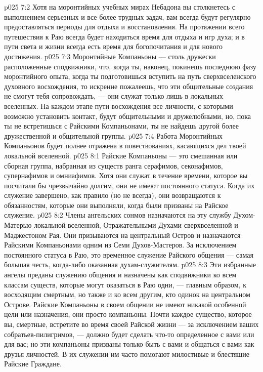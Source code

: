 \vs p025 7:2 Хотя на моронтийных учебных мирах Небадона вы столкнетесь с выполнением серьезных и все более трудных задач, вам всегда будут регулярно предоставляться периоды для отдыха и восстановления. На протяжении всего путешествия к Раю всегда будет находиться время для отдыха и игр духа; и в пути света и жизни всегда есть время для богопочитания и для нового достижения.
\vs p025 7:3 Моронтийные Компаньоны --- столь дружески расположенные сподвижники, что, когда ты, наконец, покинешь последнюю фазу моронтийного опыта, когда ты подготовишься вступить на путь сверхвселенского духовного восхождения, то искренне пожалеешь, что эти общительные создания не смогут тебя сопровождать, --- они служат только лишь в локальных вселенных. На каждом этапе пути восхождения все личности, с которыми возможно установить контакт, будут общительными и дружелюбными, но, пока ты не встретишься с Райскими Компаньонами, ты не найдешь другой более дружественной и общительной группы.
\vs p025 7:4 Работа Моронтийных Компаньонов будет полнее отражена в повествованиях, касающихся дел твоей локальной вселенной.
\vs p025 8:1 Райские Компаньоны --- это смешанная или сборная группа, набранная из существ ранга серафимов, секонафимов, супернафимов и омниафимов. Хотя они служат в течение времени, которое вы посчитали бы чрезвычайно долгим, они не имеют постоянного статуса. Когда их служение завершено, как правило (но не всегда), они возвращаются к обязанностям, которые они выполняли, когда были призваны на Райское служение.
\vs p025 8:2 Члены ангельских сонмов назначаются на эту службу Духом\hyp{}Матерью локальной вселенной, Отражательными Духами сверхвселенной и Маджестоном Рая. Они призываются на центральный Остров и назначаются Райскими Компаньонами одним из Семи Духов\hyp{}Мастеров. За исключением постоянного статуса в Раю, это временное служение Райского общения --- самая большая честь, когда\hyp{}либо оказанная духам\hyp{}служителям.
\vs p025 8:3 Эти избранные ангелы преданы служению общения и назначены как сподвижники ко всем классам существ, которые могут оказаться в Раю одни, --- главным образом, к восходящим смертным, но также и ко всем другим, кто одинок на центральном Острове. Райские Компаньоны в своем общении не имеют никакой особенной цели или назначения, они просто компаньоны. Почти каждое существо, которое вы, смертные, встретите во время своей Райской жизни --- за исключением ваших собратьев\hyp{}пилигримов, --- должно будет сделать что\hyp{}то определенное с вами или для вас; но эти компаньоны призваны только быть с вами и общаться с вами как друзья личностей. В их служении им часто помогают милостивые и блестящие Райские Граждане.
